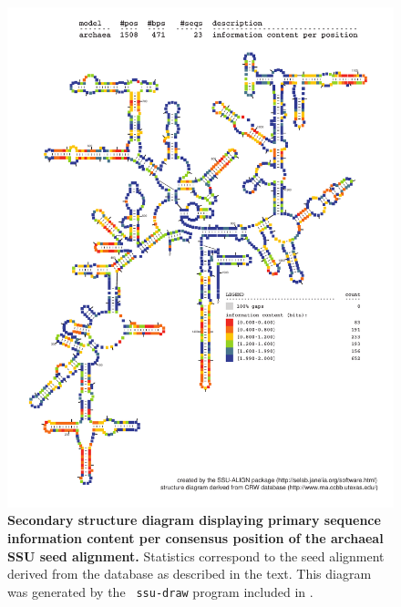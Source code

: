 \begin{figure}
\begin{center}
\includegraphics[width=5.7in]{Figures/archaea-0p1-info}
\end{center}
\caption[Secondary structure diagram displaying primary sequence
  information content per consensus position of the archaeal SSU seed
  alignment]{\textbf{Secondary structure diagram displaying primary
  sequence information content per consensus position of the archaeal SSU seed
  alignment.} Statistics correspond to the  seed
  alignment derived from the  database \cite{CannoneGutell02}
  as described in the text. This diagram was generated by the {\tt
  ssu-draw} program included in .}
\label{fig:arcinfo}
\end{figure}

